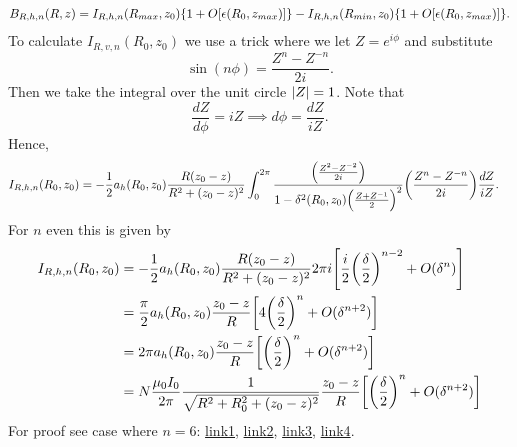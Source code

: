 \documentclass{article}
\begin{document}
\[\begin{aligned}
B_{R, h, n}(R, z)= I_{R,h,n}(R_{max}, z_0)\qty{1+O[\epsilon(R_0, z_{max})]} - I_{R,h,n}(R_{min}, z_0)\qty{1+O[\epsilon(R_0, z_{max})]}.
\end{aligned}\]
To calculate $I_{R,v,n}(R_0, z_0)$  we use a trick where we let $Z=e^{i\phi}$ and substitute
\[\sin(n\phi) = \frac{Z^n-Z^{-n}}{2i}.\]
Then we take the integral over the unit circle $\abs{Z}=1$.
Note that
\[\frac{dZ}{d\phi} = iZ \implies d\phi = \frac{dZ}{iZ}.\]
Hence,
\[\begin{aligned}
I_{R,h,n}(R_0, z_0) &= -\frac{1}{2}a_h(R_0, z_0)\frac{R(z_0-z)}{R^2+(z_0-z)^2}\int_0^{2\pi}\frac{\qty(\frac{Z^2-Z^{-2}}{2i})}{1-\delta^2(R_0, z_0)\qty(\frac{Z+Z^{-1}}{2})^2}\qty(\frac{Z^n-Z^{-n}}{2i}) \frac{dZ}{iZ}.
\end{aligned}\]
For $n$ even this is given by
\[\begin{aligned}
I_{R,h,n}(R_0, z_0) &= -\frac{1}{2}a_h(R_0, z_0)\frac{R(z_0-z)}{R^2+(z_0-z)^2}2\pi i \qty[\frac{i}{2}\qty(\frac{\delta}{2})^{n-2} + O(\delta^n)] \\
&= \frac{\pi}{2}a_h(R_0, z_0)\frac{z_0-z}{R} \qty[4\qty(\frac{\delta}{2})^n + O(\delta^{n+2})] \\
&= 2\pi a_h(R_0, z_0)\frac{z_0-z}{R} \qty[\qty(\frac{\delta}{2})^n + O(\delta^{n+2})] \\
&= N\frac{\mu_0 I_0}{2\pi}\frac{1}{\sqrt{R^2+R_0^2+(z_0-z)^2}}\frac{z_0-z}{R} \qty[\qty(\frac{\delta}{2})^n + O(\delta^{n+2})]
\end{aligned}\]
For proof see case where $n=6$:
\href{https://www.wolframalpha.com/input?i=residues+of+%28%28z%5E2-1%2Fz%5E2%29%2F%282i%29%29+*+%28z%5E6-1%2Fz%5E6%29%2F%282i%29+%2F+%281-%28%28z%2B1%2Fz%29%2F%282%29%29%5E2*gamma%5E2%29+*+%281%2F%28I*z%29%29}{link1},
\href{https://www.wolframalpha.com/input?i=Residue%5B%28I%2F4+%28-z%5E%28-2%29+%2B+z%5E2%29+%28-z%5E%28-6%29+%2B+z%5E6%29%29%2F%28z+%281+-+%28EulerGamma%5E2+%28z%5E%28-1%29+%2B+z%29%5E2%29%2F4%29%29%2C+%7Bz%2C+0%7D%5D}{link2}, 
\href{https://www.wolframalpha.com/input?i=Residue%5B%28I%2F4+%28-z%5E%28-2%29+%2B+z%5E2%29+%28-z%5E%28-6%29+%2B+z%5E6%29%29%2F%28z+%281+-+%28EulerGamma%5E2+%28z%5E%28-1%29+%2B+z%29%5E2%29%2F4%29%29%2C+%7Bz%2C+%282+-+Sqrt%5B4+-+4+EulerGamma%5E2%5D%29%2F%282+EulerGamma%29%7D%5D}{link3}, 
\href{https://www.wolframalpha.com/input?i=series+%282+i+sqrt%281+-+x+%5E2%29+%2816+-+16+x+%5E2+%2B+3+x+%5E4%29+%288+%2B+x+%5E4+-+8+sqrt%281+-+x+%5E2%29+%2B+4+x+%5E2+%28sqrt%281+-+x+%5E2%29+-+2%29%29%5E2%29%2F%28+x+%5E8+%28sqrt%281+-+x+%5E2%29+-+1%29%5E8%29}{link4}.
\end{document}
